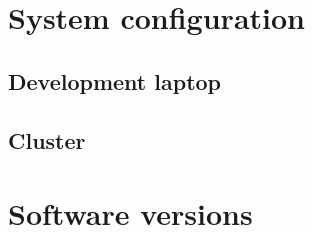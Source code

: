 \glsaddall
\printglossaries

\chapter{System configuration}
\label{ap:Configuration}

\section*{Development laptop}
\label{ap:Configuration::Laptop}





\section*{Cluster}
\label{ap:Configuration::Cluster}





\chapter{Software versions}
\label{ap:Versions}









